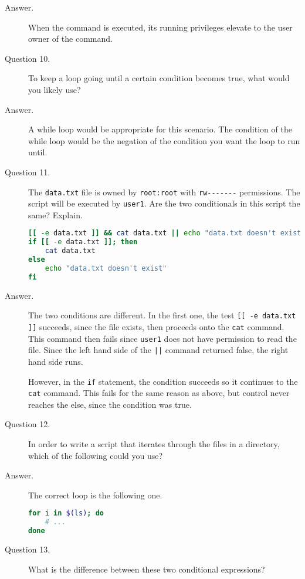 \documentclass{article}
\begin{document}
\begin{description}
	\item[Answer.]
		When the command is executed, its running privileges elevate to the user owner of the command.

	\item[Question 10.]
		To keep a loop going until a certain condition becomes true, what would you likely use?

	\item[Answer.]
		A while loop would be appropriate for this scenario. The condition of the while loop would be the negation of the condition you want the loop to run until.

	\item[Question 11.]
		The \verb`data.txt` file is owned by \verb`root:root` with \verb`rw-------` permissions. The script will be executed by \verb`user1`. Are the two conditionals in this script the same? Explain.

		\begin{lstlisting}[language=bash]
[[ -e data.txt ]] && cat data.txt || echo "data.txt doesn't exist"
if [[ -e data.txt ]]; then
	cat data.txt
else
	echo "data.txt doesn't exist"
fi
		\end{lstlisting}

	\item[Answer.]
		The two conditions are different. In the first one, the test \texttt{[[ -e data.txt ]]} succeeds, since the file exists, then proceeds onto the \verb`cat` command. This command then fails since \verb`user1` does not have permission to read the file. Since the left hand side of the \verb`||` command returned false, the right hand side runs.

		However, in the \verb`if` statement, the condition succeeds so it continues to the \verb`cat` command. This fails for the same reason as above, but control never reaches the else, since the condition was true.

	\item[Question 12.]
		In order to write a script that iterates through the files in a directory, which of the following could you use?

	\item[Answer.]
		The correct loop is the following one.

		\begin{lstlisting}[language=bash]
for i in $(ls); do
	# ...
done
		\end{lstlisting}

	\item[Question 13.]
		What is the difference between these two conditional expressions?


\end{description}
\end{document}
